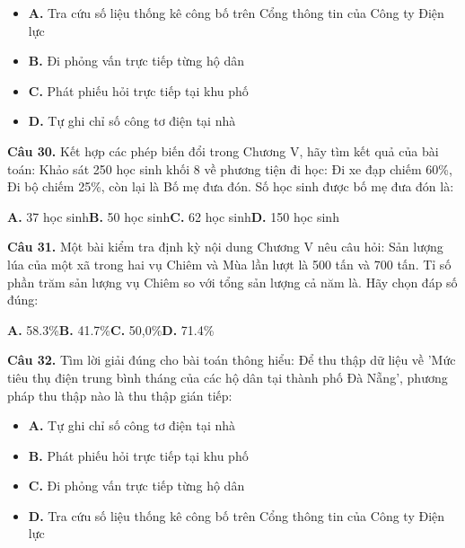 \documentclass[11pt,a4paper]{article}
\begin{document}
\begin{itemize}\setlength{\itemsep}{1pt}\setlength{\parskip}{0pt}
  \item[] \textbf{A.} Tra cứu số liệu thống kê công bố trên Cổng thông tin của Công ty Điện lực
  \item[] \textbf{B.} Đi phỏng vấn trực tiếp từng hộ dân
  \item[] \textbf{C.} Phát phiếu hỏi trực tiếp tại khu phố
  \item[] \textbf{D.} Tự ghi chỉ số công tơ điện tại nhà
\end{itemize}\vspace{2pt}
\textbf{\color{primary} Câu 30.} Kết hợp các phép biến đổi trong Chương V, hãy tìm kết quả của bài toán: Khảo sát 250 học sinh khối 8 về phương tiện đi học: Đi xe đạp chiếm 60\%, Đi bộ chiếm 25\%, còn lại là Bố mẹ đưa đón. Số học sinh được bố mẹ đưa đón là:\par
\hspace*{1.5em}\textbf{A.} 37 học sinh\quad\quad \textbf{B.} 50 học sinh\quad\quad \textbf{C.} 62 học sinh\quad\quad \textbf{D.} 150 học sinh\par\vspace{2pt}
\textbf{\color{primary} Câu 31.} Một bài kiểm tra định kỳ nội dung Chương V nêu câu hỏi: Sản lượng lúa của một xã trong hai vụ Chiêm và Mùa lần lượt là 500 tấn và 700 tấn. Tỉ số phần trăm sản lượng vụ Chiêm so với tổng sản lượng cả năm là. Hãy chọn đáp số đúng:\par
\hspace*{1.5em}\textbf{A.} 58.3\%\quad\quad \textbf{B.} 41.7\%\quad\quad \textbf{C.} 50,0\%\quad\quad \textbf{D.} 71.4\%\par\vspace{2pt}
\textbf{\color{primary} Câu 32.} Tìm lời giải đúng cho bài toán thông hiểu: Để thu thập dữ liệu về 'Mức tiêu thụ điện trung bình tháng của các hộ dân tại thành phố Đà Nẵng', phương pháp thu thập nào là thu thập gián tiếp:\par
\begin{itemize}\setlength{\itemsep}{1pt}\setlength{\parskip}{0pt}
  \item[] \textbf{A.} Tự ghi chỉ số công tơ điện tại nhà
  \item[] \textbf{B.} Phát phiếu hỏi trực tiếp tại khu phố
  \item[] \textbf{C.} Đi phỏng vấn trực tiếp từng hộ dân
  \item[] \textbf{D.} Tra cứu số liệu thống kê công bố trên Cổng thông tin của Công ty Điện lực
\end{itemize}\vspace{2pt}
\end{document}
